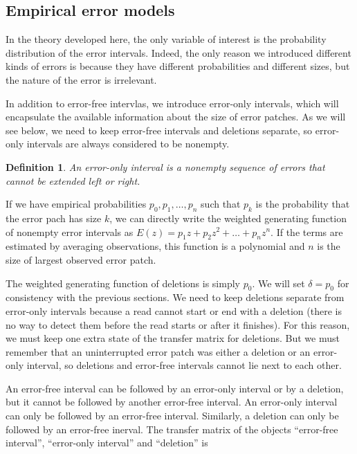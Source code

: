 \documentclass{article}
\newtheorem{definition}{Definition}
\begin{document}

\subsection{Empirical error models}
\label{subsec:empirical}

In the theory developed here, the only variable of interest is the
probability distribution of the error intervals. Indeed, the only reason
we introduced different kinds of errors is because they have different
probabilities and different sizes, but the nature of the error is
irrelevant.

In addition to error-free intervlas, we introduce error-only intervals,
which will encapsulate the available information about the size of error
patches. As we will see below, we need to keep error-free intervals and
deletions separate, so error-only intervals are always considered to be
nonempty.

\begin{definition}
\label{def:error-interval}
An error-only interval is a nonempty sequence of errors that cannot be
extended left or right.
\end{definition}

If we have empirical probabilities $p_0, p_1, \ldots, p_n$ such that $p_k$
is the probability that the error pach has size $k$, we can directly write
the weighted generating function of nonempty error intervals as $E(z) =
p_1z + p_2z^2 + \ldots + p_nz^n$. If the terms are estimated by averaging
observations, this function is a polynomial and $n$ is the size of largest
observed error patch.

The weighted generating function of deletions is simply $p_0$. We will set
$\delta = p_0$ for consistency with the previous sections. We need to keep
deletions separate from error-only intervals because a read cannot start
or end with a deletion (there is no way to detect them before the read
starts or after it finishes). For this reason, we must keep one extra
state of the transfer matrix for deletions. But we must remember that an
uninterrupted error patch was either a deletion or an error-only interval,
so deletions and error-free intervals cannot lie next to each other.

An error-free interval can be followed by an error-only interval or by a
deletion, but it cannot be followed by another error-free interval. An
error-only interval can only be followed by an error-free interval.
Similarly, a deletion can only be followed by an error-free inerval. The
transfer matrix of the objects ``error-free interval'', ``error-only
interval'' and ``deletion'' is
\end{document}
